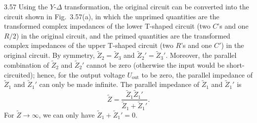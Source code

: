 \begin{solution}{3.57}
Using the $Y$-$\Delta$ transformation, the original circuit can be converted into the circuit shown in Fig.~3.57(a), in which the unprimed quantities are the transformed complex impedances of the lower T-shaped circuit (two $C$'s and one $R/2$) in the original circuit, and the primed quantities are the transformed complex impedances of the upper T-shaped circuit (two $R$'s and one $C'$) in the original circuit. By symmetry, $\tilde{Z}_2=\tilde{Z}_3$ and $\tilde{Z}_2'=\tilde{Z}_3'$. Moreover, the parallel combination of $\tilde{Z}_2$ and $\tilde{Z}_2'$ cannot be zero (otherwise the input would be short-circuited); hence, for the output voltage $U_{\mathrm{out}}$ to be zero, the parallel impedance of $\tilde{Z}_1$ and $\tilde{Z}_1'$ can only be made infinite. The parallel impedance of $\tilde{Z}_1$ and $\tilde{Z}_1'$ is
\[
\tilde{Z}=\frac{\tilde{Z}_1\tilde{Z}_1'}{\tilde{Z}_1+\tilde{Z}_1'}.
\]
For $\tilde{Z}\to\infty$, we can only have $\tilde{Z}_1+\tilde{Z}_1'=0$.


\end{solution}
